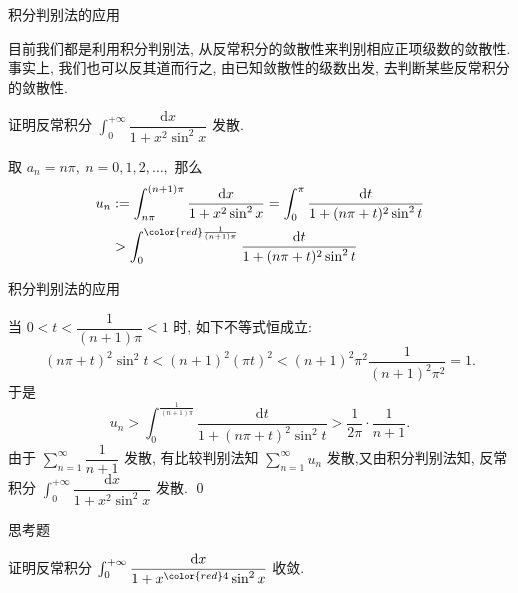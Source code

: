 \begin{frame}{积分判别法的应用}

目前我们都是利用积分判别法, 从反常积分的敛散性来判别相应正项级数的敛散性. 事实上, 我们也可以反其道而行之, 由已知敛散性的级数出发, 去判断某些反常积分的敛散性.

\pause
\vspace{0.6em}

\begin{eg}
\begin{center}
证明反常积分 $\int_0^{+\infty} \dfrac{\mathrm{d} x}{1 + x^2\sin^2 x}$ 发散.
\end{center}
\end{eg}

\pause
\vspace{0.6em}

\startproof[bg=yellow, fg=red]
取 $a_n = n\pi, ~ n = 0, 1, 2, \dots,$ 那么
\begin{align*}
u_n & := \int_{n\pi}^{(n+1)\pi} \dfrac{\mathrm{d} x}{1 + x^2\sin^2 x} = \int_{0}^{\pi} \dfrac{\mathrm{d} t}{1 + (n\pi + t)^2\sin^2 t} \\
& > \int_{0}^{{\color{red} \frac{1}{(n+1)\pi}}} \dfrac{\mathrm{d} t}{1 + (n\pi + t)^2\sin^2 t}
\end{align*}

\end{frame}


\begin{frame}{积分判别法的应用}

当 $0 < t < \dfrac{1}{(n+1)\pi} < 1$ 时, 如下不等式恒成立:
\vspace*{-0.6em}
\[(n\pi + t)^2 \sin^2 t < (n + 1)^2 (\pi t)^2 < (n + 1)^2 \pi^2 \dfrac{1}{(n+1)^2\pi^2} = 1.\]
于是
\vspace*{-1.2em}
\[u_n > \int_{0}^{\frac{1}{(n+1)\pi}} \dfrac{\mathrm{d} t}{1 + (n\pi + t)^2\sin^2 t} > \dfrac{1}{2\pi} \cdot \dfrac{1}{n+1}.\]
由于 $\sum\limits_{n=1}^\infty \dfrac{1}{n+1}$ 发散, 有比较判别法知 $\sum\limits_{n=1}^\infty u_n$ 发散,又由积分判别法知, 反常积分 $\int_0^{+\infty} \dfrac{\mathrm{d} x}{1 + x^2\sin^2 x}$ 发散.
\qed

\pause

\begin{block}{思考题}
\begin{center}
证明反常积分 $\int_0^{+\infty} \dfrac{\mathrm{d} x}{1 + x^{\color{red}4}\sin^2 x}$ 收敛.
\end{center}
\end{block}

\end{frame}

